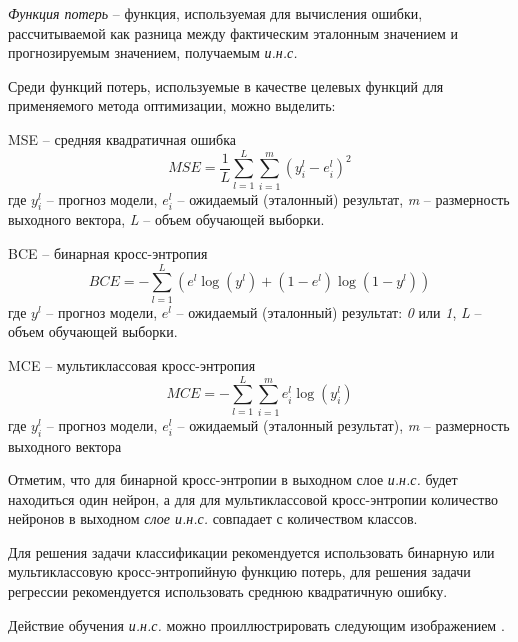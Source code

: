 \textit{Функция потерь} -- функция, используемая для вычисления ошибки, рассчитываемой как разница между фактическим эталонным значением и прогнозируемым значением, получаемым \textit{и.н.с.}

Среди функций потерь, используемые в качестве целевых функций для применяемого метода оптимизации, можно выделить:

\begin{textitemize}
	\item MSE -- средняя квадратичная ошибка\\
	\begin{equation*}
		MSE = \frac{1}{L} \sum_{l=1}^L \sum_{i=1}^m (y_i^l - e_i^l)^2
	\end{equation*}
	где $y_i^l$ -- прогноз модели, $e_i^l$ -- ожидаемый (эталонный) результат, \textit{m} -- размерность выходного вектора, \textit{L} -- объем обучающей выборки.

	\item BCE -- бинарная кросс-энтропия\\
	\begin{equation*}
		BCE = - \sum_{l=1}^L (e^l \log(y^l) + (1 - e^l)\log(1 - y^l))
	\end{equation*}
	где $y^l$ -- прогноз модели, $e^l$ -- ожидаемый (эталонный) результат: \textit{0} или \textit{1}, \textit{L} -- объем обучающей выборки.
	\item MCE -- мультиклассовая кросс-энтропия\\
	\begin{equation*}
		MCE = - \sum_{l=1}^L \sum_{i=1}^m e_{i}^l \log(y_{i}^l)
	\end{equation*}
	где $y_{i}^l$ -- прогноз модели, $e_i^l$ -- ожидаемый (эталонный результат), \textit{m} -- размерность выходного вектора
\end{textitemize}

Отметим, что для бинарной кросс-энтропии в выходном слое \textit{и.н.с.} будет находиться один нейрон, а для для мультиклассовой кросс-энтропии количество нейронов в выходном \textit{слое и.н.с.} совпадает с количеством классов.

Для решения задачи классификации рекомендуется использовать бинарную или мультиклассовую кросс-энтропийную функцию потерь, для решения задачи регрессии рекомендуется использовать среднюю квадратичную ошибку.

Действие обучения \textit{и.н.с.} можно проиллюстрировать следующим изображением \textit{}.

